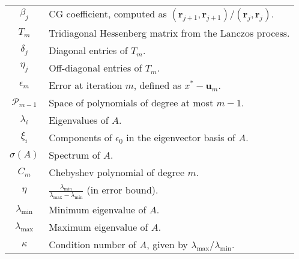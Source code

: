 \begin{longtable}{c p{10cm}}
    $\beta_j$                       & CG coefficient, computed as $(\mathbf{r}_{j+1}, \mathbf{r}_{j+1})/(\mathbf{r}_j, \mathbf{r}_j)$.              \\
    $T_m$                           & Tridiagonal Hessenberg matrix from the Lanczos process.                                                       \\
    $\delta_j$                      & Diagonal entries of $T_m$.                                                                                    \\
    $\eta_j$                        & Off-diagonal entries of $T_m$.                                                                                \\
    $\epsilon_m$                    & Error at iteration $m$, defined as $x^* - \mathbf{u}_m$.                                                      \\
    $\mathcal{P}_{m-1}$             & Space of polynomials of degree at most $m-1$.                                                                 \\
    $\lambda_i$                     & Eigenvalues of $A$.                                                                                           \\
    $\xi_i$                         & Components of $\epsilon_0$ in the eigenvector basis of $A$.                                                   \\
    $\sigma(A)$                     & Spectrum of $A$.                                                                                              \\
    $C_m$                           & Chebyshev polynomial of degree $m$.                                                                           \\
    $\eta$                          & $\displaystyle\frac{\lambda_{\min}}{\lambda_{\max}-\lambda_{\min}}$ (in error bound).                         \\
    $\lambda_{\min}$                & Minimum eigenvalue of $A$.                                                                                    \\
    $\lambda_{\max}$                & Maximum eigenvalue of $A$.                                                                                    \\
    $\kappa$                        & Condition number of $A$, given by $\lambda_{\max}/\lambda_{\min}$.                                            \\

\end{longtable}
